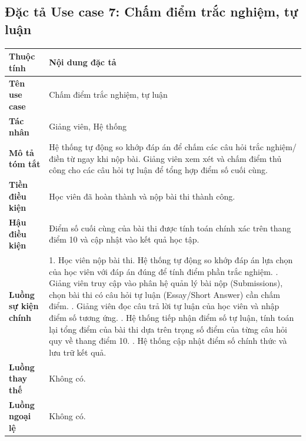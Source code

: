 \documentclass[../DoAn.tex]{subfiles}
\begin{document}
\subsection{Đặc tả Use case 7: Chấm điểm trắc nghiệm, tự luận}
\nopagebreak
\begingroup
\centering
\fontsize{11pt}{14pt}\selectfont
\begin{tabular}{|p{3.2cm}|p{10.8cm}|}
\hline
\textbf{Thuộc tính} & \textbf{Nội dung đặc tả} \\ \hline
\textbf{Tên use case} & Chấm điểm trắc nghiệm, tự luận \\ \hline
\textbf{Tác nhân} & Giảng viên, Hệ thống \\ \hline
\textbf{Mô tả tóm tắt} & Hệ thống tự động so khớp đáp án để chấm các câu hỏi trắc nghiệm/điền từ ngay khi nộp bài. Giảng viên xem xét và chấm điểm thủ công cho các câu hỏi tự luận để tổng hợp điểm số cuối cùng. \\ \hline
\textbf{Tiền điều kiện} & Học viên đã hoàn thành và nộp bài thi thành công. \\ \hline
\textbf{Hậu điều kiện} & Điểm số cuối cùng của bài thi được tính toán chính xác trên thang điểm 10 và cập nhật vào kết quả học tập. \\ \hline
\textbf{Luồng sự kiện chính} & 
1. Học viên nộp bài thi. Hệ thống tự động so khớp đáp án lựa chọn của học viên với đáp án đúng để tính điểm phần trắc nghiệm. \newline
2. Giảng viên truy cập vào phân hệ quản lý bài nộp (Submissions), chọn bài thi có câu hỏi tự luận (Essay/Short Answer) cần chấm điểm. \newline
3. Giảng viên đọc câu trả lời tự luận của học viên và nhập điểm số tương ứng. \newline
4. Hệ thống tiếp nhận điểm số tự luận, tính toán lại tổng điểm của bài thi dựa trên trọng số điểm của từng câu hỏi quy về thang điểm 10. \newline
5. Hệ thống cập nhật điểm số chính thức và lưu trữ kết quả. \\ \hline
\textbf{Luồng thay thế} & Không có. \\ \hline
\textbf{Luồng ngoại lệ} & Không có. \\ \hline
\end{tabular}
\label{table:uc_grade_exam_auto_manual}
\par
\endgroup

\newpage
\end{document}
